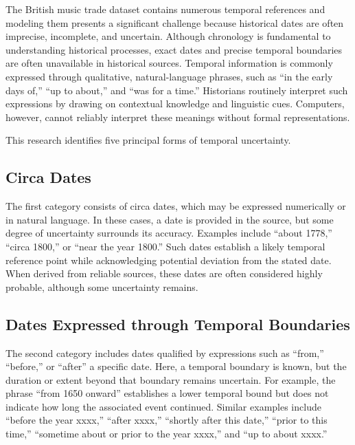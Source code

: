 \documentclass[final]{anthology-ch} %
\begin{document}
The British music trade dataset contains numerous temporal references and modeling them presents a significant challenge because historical dates are often imprecise, incomplete, and uncertain. Although chronology is fundamental to understanding historical processes, exact dates and precise temporal boundaries are often unavailable in historical sources. Temporal information is commonly expressed through qualitative, natural-language phrases, such as \enquote{in the early days of,} \enquote{up to about,} and \enquote{was for a time.} Historians routinely interpret such expressions by drawing on contextual knowledge and linguistic cues. Computers, however, cannot reliably interpret these meanings without formal representations.

This research identifies five principal forms of temporal uncertainty.

\subsection{Circa Dates}

The first category consists of circa dates, which may be expressed numerically or in natural language. In these cases, a date is provided in the source, but some degree of uncertainty surrounds its accuracy. Examples include \enquote{about 1778,} \enquote{circa 1800,} or \enquote{near the year 1800.} Such dates establish a likely temporal reference point while acknowledging potential deviation from the stated date. When derived from reliable sources, these dates are often considered highly probable, although some uncertainty remains.

\subsection{Dates Expressed through Temporal Boundaries}

The second category includes dates qualified by expressions such as \enquote{from,} \enquote{before,} or \enquote{after} a specific date. Here, a temporal boundary is known, but the duration or extent beyond that boundary remains uncertain. For example, the phrase \enquote{from 1650 onward} establishes a lower temporal bound but does not indicate how long the associated event continued. Similar examples include \enquote{before the year xxxx,} \enquote{after xxxx,} \enquote{shortly after this date,} \enquote{prior to this time,} \enquote{sometime about or prior to the year xxxx,} and \enquote{up to about xxxx.}
\end{document}
